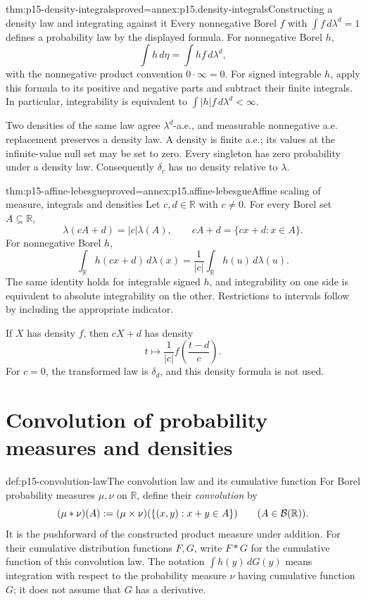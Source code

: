 \begin{hbtheorem}{thm:p15-density-integrals}{proved=annex:p15.density-integrals}{Constructing a density law and integrating against it}
Every nonnegative Borel \(f\) with \(\int f\,d\lambda^d=1\)
defines a probability law by the displayed formula. For nonnegative
Borel \(h\),
\[
 \int h\,d\eta=\int hf\,d\lambda^d,
\]
with the nonnegative product convention \(0\cdot\infty=0\).
For signed integrable \(h\), apply this formula to its positive
and negative parts and subtract their finite integrals. In particular,
integrability is equivalent to \(\int|h|f\,d\lambda^d<\infty\).

Two densities of the same law agree \(\lambda^d\)-a.e., and measurable
nonnegative a.e. replacement preserves a density law. A density is finite a.e.;
its values at the infinite-value null set may be set to zero. Every
singleton has zero probability under a density law. Consequently
\(\delta_c\) has no density relative to \(\lambda\).
\end{hbtheorem}

\begin{hbtheorem}{thm:p15-affine-lebesgue}{proved=annex:p15.affine-lebesgue}{Affine scaling of measure, integrals and densities}
Let \(c,d\in\mathbb R\) with \(c\ne0\). For every Borel set
\(A\subseteq\mathbb R\),
\[
 \lambda(cA+d)=|c|\lambda(A),
 \qquad cA+d=\{cx+d:x\in A\}.
\]
For nonnegative Borel \(h\),
\[
 \int_{\mathbb R}h(cx+d)\,d\lambda(x)
                 =\frac1{|c|}\int_{\mathbb R}h(u)\,d\lambda(u).
\]
The same identity holds for integrable signed \(h\), and integrability
on one side is equivalent to absolute integrability on the other.
Restrictions to intervals follow by including the appropriate indicator.

If \(X\) has density \(f\), then \(cX+d\) has density
\[
 t\longmapsto\frac1{|c|}f\left(\frac{t-d}{c}\right).
\]
For \(c=0\), the transformed law is \(\delta_d\), and this
density formula is not used.
\end{hbtheorem}

\section{Convolution of probability measures and densities}
\label{sec:p15-convolution-laws}

\begin{hbdefinition}{def:p15-convolution-law}{The convolution law and its cumulative function}
For Borel probability measures \(\mu,\nu\) on \(\mathbb R\),
define their \emph{convolution} by
\[
 (\mu*\nu)(A)\mathrel{:=}
 (\mu\times\nu)(\{(x,y):x+y\in A\})
                       \qquad(A\in\mathcal B(\mathbb R)).
\]
It is the pushforward of the constructed product measure under addition.
For their cumulative distribution functions \(F,G\), write
\(F*G\) for the cumulative function of this convolution law.
The notation \(\int h(y)\,dG(y)\) means integration with respect
to the probability measure \(\nu\) having cumulative function \(G\);
it does not assume that \(G\) has a derivative.
\end{hbdefinition}

